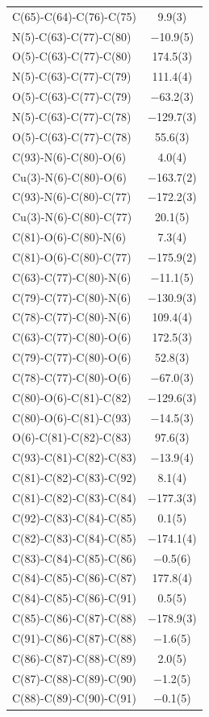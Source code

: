 \begin{center}
{\begin{supertabular}{p{1.8in}c}
C(65)-C(64)-C(76)-C(75)&9.9(3)\\
N(5)-C(63)-C(77)-C(80)&$-$10.9(5)\\
O(5)-C(63)-C(77)-C(80)&174.5(3)\\
N(5)-C(63)-C(77)-C(79)&111.4(4)\\
O(5)-C(63)-C(77)-C(79)&$-$63.2(3)\\
N(5)-C(63)-C(77)-C(78)&$-$129.7(3)\\
O(5)-C(63)-C(77)-C(78)&55.6(3)\\
C(93)-N(6)-C(80)-O(6)&4.0(4)\\
Cu(3)-N(6)-C(80)-O(6)&$-$163.7(2)\\
C(93)-N(6)-C(80)-C(77)&$-$172.2(3)\\
Cu(3)-N(6)-C(80)-C(77)&20.1(5)\\
C(81)-O(6)-C(80)-N(6)&7.3(4)\\
C(81)-O(6)-C(80)-C(77)&$-$175.9(2)\\
C(63)-C(77)-C(80)-N(6)&$-$11.1(5)\\
C(79)-C(77)-C(80)-N(6)&$-$130.9(3)\\
C(78)-C(77)-C(80)-N(6)&109.4(4)\\
C(63)-C(77)-C(80)-O(6)&172.5(3)\\
C(79)-C(77)-C(80)-O(6)&52.8(3)\\
C(78)-C(77)-C(80)-O(6)&$-$67.0(3)\\
C(80)-O(6)-C(81)-C(82)&$-$129.6(3)\\
C(80)-O(6)-C(81)-C(93)&$-$14.5(3)\\
O(6)-C(81)-C(82)-C(83)&97.6(3)\\
C(93)-C(81)-C(82)-C(83)&$-$13.9(4)\\
C(81)-C(82)-C(83)-C(92)&8.1(4)\\
C(81)-C(82)-C(83)-C(84)&$-$177.3(3)\\
C(92)-C(83)-C(84)-C(85)&0.1(5)\\
C(82)-C(83)-C(84)-C(85)&$-$174.1(4)\\
C(83)-C(84)-C(85)-C(86)&$-$0.5(6)\\
C(84)-C(85)-C(86)-C(87)&177.8(4)\\
C(84)-C(85)-C(86)-C(91)&0.5(5)\\
C(85)-C(86)-C(87)-C(88)&$-$178.9(3)\\
C(91)-C(86)-C(87)-C(88)&$-$1.6(5)\\
C(86)-C(87)-C(88)-C(89)&2.0(5)\\
C(87)-C(88)-C(89)-C(90)&$-$1.2(5)\\
C(88)-C(89)-C(90)-C(91)&$-$0.1(5)\\

\end{supertabular}}
\end{center}
